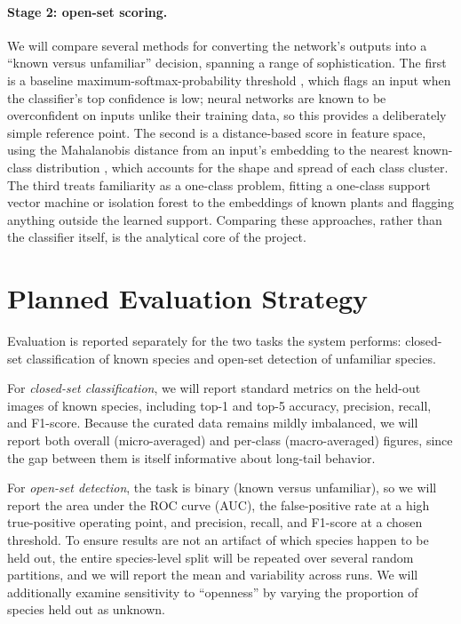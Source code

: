 \documentclass[11pt]{article}
\begin{document}
\paragraph{Stage 2: open-set scoring.} We will compare several methods for converting the network's outputs into a ``known versus unfamiliar'' decision, spanning a range of sophistication. The first is a baseline maximum-softmax-probability threshold \cite{hendrycks2017baseline}, which flags an input when the classifier's top confidence is low; neural networks are known to be overconfident on inputs unlike their training data, so this provides a deliberately simple reference point. The second is a distance-based score in feature space, using the Mahalanobis distance from an input's embedding to the nearest known-class distribution \cite{lee2018mahalanobis}, which accounts for the shape and spread of each class cluster. The third treats familiarity as a one-class problem, fitting a one-class support vector machine \cite{scholkopf2001oneclass} or isolation forest \cite{liu2008isolation} to the embeddings of known plants and flagging anything outside the learned support. Comparing these approaches, rather than the classifier itself, is the analytical core of the project.

\section{Planned Evaluation Strategy}

Evaluation is reported separately for the two tasks the system performs: closed-set classification of known species and open-set detection of unfamiliar species.

For \emph{closed-set classification}, we will report standard metrics on the held-out images of known species, including top-1 and top-5 accuracy, precision, recall, and F1-score. Because the curated data remains mildly imbalanced, we will report both overall (micro-averaged) and per-class (macro-averaged) figures, since the gap between them is itself informative about long-tail behavior.

For \emph{open-set detection}, the task is binary (known versus unfamiliar), so we will report the area under the ROC curve (AUC), the false-positive rate at a high true-positive operating point, and precision, recall, and F1-score at a chosen threshold. To ensure results are not an artifact of which species happen to be held out, the entire species-level split will be repeated over several random partitions, and we will report the mean and variability across runs. We will additionally examine sensitivity to ``openness'' by varying the proportion of species held out as unknown.
\end{document}
